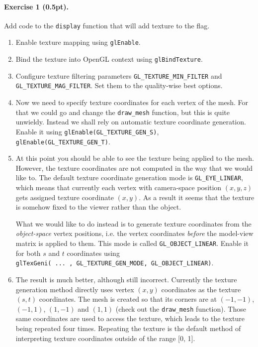 \documentclass{article}
\newenvironment{exercise}[2]{\paragraph{Exercise #1 (#2pt).} }{
\medskip}
\begin{document}
\begin{exercise}{1}{0.5}
Add code to the \texttt{display} function that will add texture to the flag.
\begin{enumerate}
\item Enable texture mapping using \texttt{glEnable}.
\item Bind the texture into OpenGL context using \texttt{glBindTexture}.
\item Configure texture filtering parameters \verb#GL_TEXTURE_MIN_FILTER# and\\ \verb#GL_TEXTURE_MAG_FILTER#. Set them to the quality-wise best options.
\item Now we need to specify texture coordinates for each vertex of the mesh. For that we could go and change the \verb#draw_mesh# function, but this is quite unwieldy. Instead we shall rely on automatic texture coordinate generation. Enable it using \verb#glEnable(GL_TEXTURE_GEN_S)#,\\ \verb#glEnable(GL_TEXTURE_GEN_T)#.
\item At this point you should be able to see the texture being applied to the mesh. However, the texture coordinates are not computed in the way that we would like to. The default texture coordinate generation mode is \verb#GL_EYE_LINEAR#, which means that currently each vertex with camera-space position $(x, y, z)$ gets assigned texture coordinate $(x, y)$. As a result it seems that the texture is somehow fixed to the viewer rather than the object.

What we would like to do instead is to generate texture coordinates from the \emph{object-space} vertex positions, i.e. the vertex coordinates \emph{before} the model-view matrix is applied to them. This mode is called \verb#GL_OBJECT_LINEAR#. Enable it for both $s$ and $t$ coordinates using \\
\verb#glTexGeni( ... , GL_TEXTURE_GEN_MODE, GL_OBJECT_LINEAR)#.

\item The result is much better, although still incorrect. Currently the texture generation method directly uses vertex $(x,y)$ coordinates as the texture $(s,t)$ coordinates. The mesh is created so that its corners are at $(-1, -1)$, $(-1, 1)$, $(1, -1)$ and $(1, 1)$ (check out the \verb#draw_mesh# function). Those same coordinates are used to access the texture, which leads to the texture being repeated four times. Repeating the texture is the default method of interpreting texture coordinates outside of the range [0, 1].


\end{enumerate}
\end{exercise}
\end{document}
